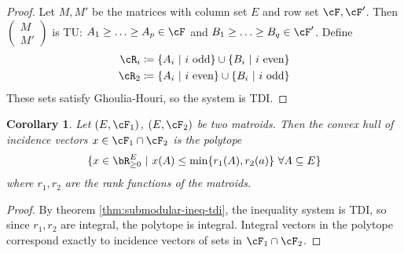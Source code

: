 \documentclass[11pt, a4paper]{article}
\newcommand{\set}[1]{\{#1\}}
\newtheorem{cor}[theorem]{Corollary}
\theoremstyle{remark}
\theoremstyle{definition}
\begin{document}
\begin{proof}
	Let $M,M'$ be the matrices with column set $E$ and row set
	$\cF,\cF'$. Then $\begin{pmatrix} M \\ M'\end{pmatrix}$ is TU: $A_1\geq \ldots\geq A_p
		\in\cF$ and $B_1\geq\ldots\geq B_q\in\cF'$. Define
	\begin{align*}
		\cR_i & \coloneqq \set{A_i\ |\ i\text{ odd}}\cup \set{B_i\ |\ i\text{ even}} \\
		\cR_2 & \coloneqq \set{A_i\ |\ i\text{ even}}\cup\set{B_i\ |\ i\text{ odd}}
	\end{align*}
	These sets satisfy Ghoulia-Houri, so the system is TDI.
\end{proof}


\begin{cor}
	Let $(E,\cF_1)$, $(E,\cF_2)$ be two matroids. Then the convex hull of
	incidence vectors $x\in \cF_1\cap\cF_2$ is the polytope
	\[\set{x\in\bR^E_{\geq0}\ |\
		x(A)\leq\min\set{r_1(A),r_2(a)}\ \forall A\subseteq E}\]
	where $r_1,r_2$ are the rank functions of the matroids.
\end{cor}
\begin{proof}
	By theorem \ref{thm:submodular-ineq-tdi}, the inequality system is TDI,
	so since $r_1,r_2$ are integral, the polytope is integral. Integral
	vectors in the polytope correspond exactly to incidence vectors of
	sets in $\cF_1\cap\cF_2$.
\end{proof}
\end{document}
